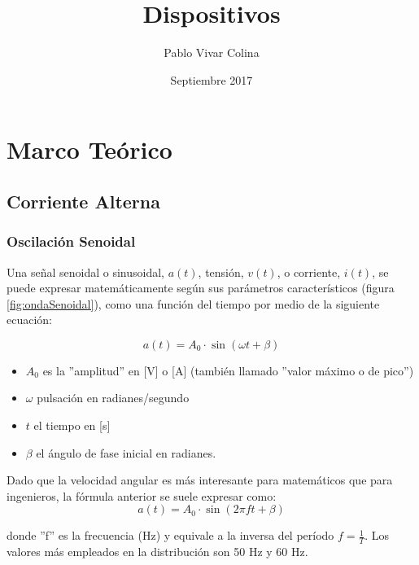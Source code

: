 \documentclass{article}
\title{Dispositivos}
\author{Pablo Vivar Colina}
\date{Septiembre 2017}
\begin{document}
\section{Marco Teórico}

\subsection{Corriente Alterna}

  \subsubsection{Oscilación Senoidal}

Una señal senoidal o sinusoidal, $a(t)$, tensión, $v(t)$, o corriente, $i(t)$, se puede expresar matemáticamente según sus parámetros característicos (figura \ref{fig:ondaSenoidal}), como una función del tiempo por medio de la siguiente ecuación:\citep{CA}

\begin{equation}
    a(t)=A_0 \cdot \sin(\omega t + \beta)
\end{equation}
\begin{itemize}
    \item $A_0$ es la ''amplitud'' en [V] o [A] (también llamado ''valor máximo o de pico'')
    
    \item $\omega$  pulsación en radianes/segundo
    
    \item $t$ el tiempo en [s]
    
    \item $\beta$ el ángulo de fase inicial en radianes.
\end{itemize}


Dado que la velocidad angular es más interesante para matemáticos que para ingenieros, la fórmula anterior se suele expresar como:\citep{CA}\\

\begin{equation}
    a(t)=A_0 \cdot \sin(2 \pi f t + \beta)
\end{equation}


donde ''f'' es la frecuencia (Hz) y equivale a la inversa del período $f=\frac{1}{T}$. Los valores más empleados en la distribución son 50 Hz y 60 Hz.\citep{CA}
\end{document}
